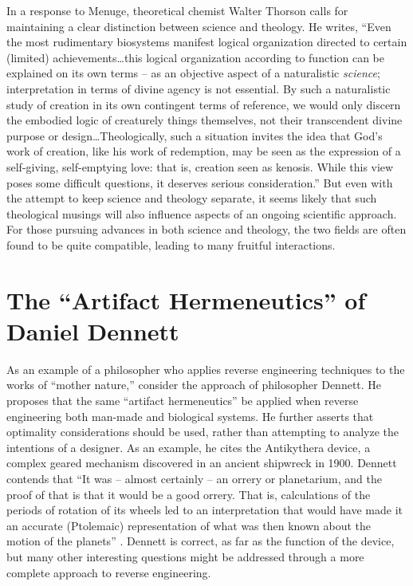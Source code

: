 In a response to Menuge, theoretical chemist Walter Thorson calls for
maintaining a clear distinction between science and theology. He
writes, ``Even the most rudimentary biosystems manifest logical
organization directed to certain (limited) achievements{\ldots}this logical
organization according to function can be explained on its own terms –
as an objective aspect of a naturalistic \textit{science};
interpretation in terms of divine agency is not essential. By such a
naturalistic study of creation in its own contingent terms of
reference, we would only discern the embodied logic of creaturely
things themselves, not their transcendent divine purpose or
design{\ldots}Theologically, such a situation invites the idea that God’s work
of creation, like his work of redemption, may be seen as the expression
of a self-giving, self-emptying love: that is, creation seen as
kenosis. While this view poses some difficult questions, it deserves
serious consideration.''\citep[][pg. 101]{thorson2003} But even with the attempt
to keep science and theology separate, it seems likely that such
theological musings will also influence aspects of an ongoing
scientific approach. For those pursuing advances in both science and
theology, the two fields are often found to be quite compatible,
leading to many fruitful interactions.

\section{The “Artifact Hermeneutics” of Daniel Dennett}

As an example of a philosopher who applies reverse engineering
techniques to the works of “mother nature,” consider the approach of
philosopher Dennett. He proposes that the same “artifact hermeneutics”
be applied when reverse engineering both man-made and biological
systems.\citep[][pg. 177]{dennett1990} He further asserts that optimality
considerations should be used, rather than attempting to analyze the
intentions of a designer. As an example, he cites the Antikythera
device, a complex geared mechanism discovered in an ancient shipwreck
in 1900. Dennett contends that “It was – almost certainly – an orrery
or planetarium, and the proof of that is that it would be a good
orrery. That is, calculations of the periods of rotation of its wheels
led to an interpretation that would have made it an accurate
(Ptolemaic) representation of what was then known about the motion of
the planets” \citep[][pg. 180]{dennett1990}. Dennett is correct, as far as the
function of the device, but many other interesting questions might be
addressed through a more complete approach to reverse engineering.

